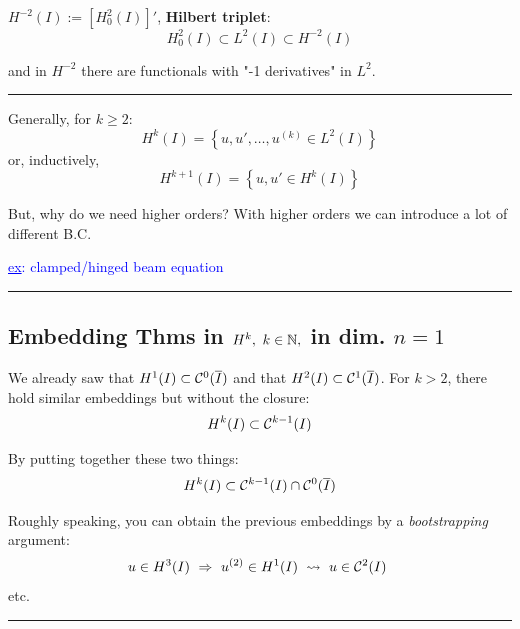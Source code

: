 $H^{-2}(I):=\left[ H^2_0(I) \right]'$, \textbf{Hilbert triplet}:
\begin{equation*}
H_0^2(I)\subset L^2(I) \subset H^{-2}(I)
\end{equation*}

and in $H^{-2}$ there are functionals with "-1 derivatives" in $L^2$.

\rule{0.31\textwidth}{0.2pt}
\smallskip

Generally, for $k\geq 2$:
\begin{equation*}
H^k(I)=\left\{ u,u',\dots,u^{(k)}\in L^2(I) \right\}
\end{equation*}
or, inductively,
\begin{equation*}
H^{k+1}(I)=\left\{ u,u'\in H^{k}(I) \right\}
\end{equation*}

But, why do we need higher orders? With higher orders we can introduce a lot of different B.C.

\textcolor{blue}{\underline{ex}: clamped/hinged beam equation}

\rule{0.31\textwidth}{0.2pt}


\subsection{\color{red}Embedding Thms in \texorpdfstring{$H^k,\ k\in\mathbb{N},$}{C} in dim. \texorpdfstring{$n=1$}{C}}


We already saw that $H^1(I)\subset \mathcal{C}^0(\overline{I})$ and that $H^2(I)\subset \mathcal{C}^1(\overline{I})$. For $k>2$, there hold similar embeddings but without the closure:
\begin{equation*}
H^k(I)\subset \mathcal{C}^{k-1}(I)
\end{equation*}

By putting together these two things:
\begin{equation*}
H^k(I)\subset \mathcal{C}^{k-1}(I)\cap\mathcal{C}^0(\overline{I})
\end{equation*}

Roughly speaking, you can obtain the previous embeddings by a \emph{bootstrapping} argument:
\begin{equation*}
u\in H^3(I)\ \Rightarrow \ u^{(2)}\in H^1(I) \ \leadsto \ u\in\Cc^2(I)\ 
\end{equation*}
etc.

\rule{0.31\textwidth}{0.2pt}

